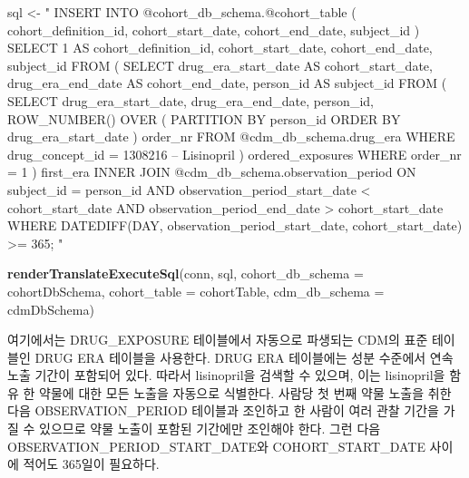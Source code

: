 \documentclass[11pt]{book}
\newenvironment{Shaded}{\begin{snugshade}}{\end{snugshade}}
\newcommand{\KeywordTok}[1]{\textcolor[rgb]{0.13,0.29,0.53}{\textbf{#1}}}
\newcommand{\DataTypeTok}[1]{\textcolor[rgb]{0.13,0.29,0.53}{#1}}
\newcommand{\StringTok}[1]{\textcolor[rgb]{0.31,0.60,0.02}{#1}}
\newcommand{\NormalTok}[1]{#1}
\theoremstyle{definition}
\theoremstyle{definition}
\theoremstyle{definition}
\theoremstyle{remark}
\begin{document}
\begin{Shaded}
\begin{Highlighting}[]
\NormalTok{sql <-}\StringTok{ "}
\StringTok{INSERT INTO @cohort_db_schema.@cohort_table (}
\StringTok{  cohort_definition_id,}
\StringTok{  cohort_start_date,}
\StringTok{  cohort_end_date,}
\StringTok{  subject_id}
\StringTok{)}
\StringTok{SELECT 1 AS cohort_definition_id,}
\StringTok{  cohort_start_date,}
\StringTok{  cohort_end_date,}
\StringTok{  subject_id}
\StringTok{FROM (}
\StringTok{  SELECT drug_era_start_date AS cohort_start_date,}
\StringTok{    drug_era_end_date AS cohort_end_date,}
\StringTok{    person_id AS subject_id}
\StringTok{  FROM (}
\StringTok{    SELECT drug_era_start_date,}
\StringTok{      drug_era_end_date,}
\StringTok{      person_id,}
\StringTok{      ROW_NUMBER() OVER (}
\StringTok{        PARTITION BY person_id}
\StringTok{            ORDER BY drug_era_start_date}
\StringTok{      ) order_nr}
\StringTok{    FROM @cdm_db_schema.drug_era}
\StringTok{    WHERE drug_concept_id = 1308216 -- Lisinopril}
\StringTok{  ) ordered_exposures}
\StringTok{  WHERE order_nr = 1}
\StringTok{) first_era}
\StringTok{INNER JOIN @cdm_db_schema.observation_period}
\StringTok{  ON subject_id = person_id}
\StringTok{    AND observation_period_start_date < cohort_start_date}
\StringTok{    AND observation_period_end_date > cohort_start_date}
\StringTok{WHERE DATEDIFF(DAY,}
\StringTok{               observation_period_start_date,}
\StringTok{               cohort_start_date) >= 365;}
\StringTok{"}

\KeywordTok{renderTranslateExecuteSql}\NormalTok{(conn, sql,}
                          \DataTypeTok{cohort_db_schema =}\NormalTok{ cohortDbSchema,}
                          \DataTypeTok{cohort_table =}\NormalTok{ cohortTable,}
                          \DataTypeTok{cdm_db_schema =}\NormalTok{ cdmDbSchema)}
\end{Highlighting}
\end{Shaded}

여기에서는 DRUG\_EXPOSURE 테이블에서 자동으로 파생되는 CDM의 표준
테이블인 DRUG ERA 테이블을 사용한다. DRUG ERA 테이블에는 성분 수준에서
연속 노출 기간이 포함되어 있다. 따라서 lisinopril을 검색할 수 있으며,
이는 lisinopril을 함유 한 약물에 대한 모든 노출을 자동으로 식별한다.
사람당 첫 번째 약물 노출을 취한 다음 OBSERVATION\_PERIOD 테이블과
조인하고 한 사람이 여러 관찰 기간을 가질 수 있으므로 약물 노출이 포함된
기간에만 조인해야 한다. 그런 다음 OBSERVATION\_PERIOD\_START\_DATE와
COHORT\_START\_DATE 사이에 적어도 365일이 필요하다.
\end{document}
